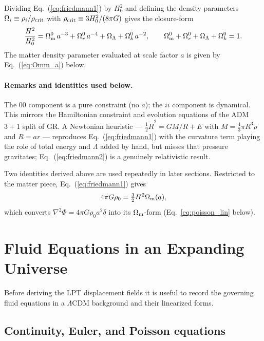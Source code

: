 \documentclass[12pt]{article}
\newcommand{\Omm}{\Omega_{\rm m}}
\begin{document}
Dividing Eq.~(\ref{eq:friedmann1}) by $H_0^2$ and defining the
density parameters $\Omega_i \equiv \rho_i/\rho_{\rm crit}$ with
$\rho_{\rm crit} \equiv 3H_0^2/(8\pi G)$ gives the closure-form
%
\begin{equation}
  \frac{H^2}{H_0^2}
  = \Omm^0\,a^{-3} + \Omega_r^0\,a^{-4}
    + \Omega_\Lambda + \Omega_k^0\,a^{-2},
  \qquad
  \Omm^0+\Omega_r^0+\Omega_\Lambda+\Omega_k^0 = 1.
  \label{eq:friedmann_omega}
\end{equation}
%
The matter density parameter evaluated at scale factor $a$ is given
by Eq.~(\ref{eq:Omm_a}) below.

\paragraph{Remarks and identities used below.}
The $00$ component is a pure constraint (no $\ddot a$); the $ii$
component is dynamical.  This mirrors the Hamiltonian constraint and
evolution equations of the ADM $3+1$ split of GR.  A Newtonian
heuristic --- $\tfrac{1}{2}\dot R^2 = GM/R + E$ with
$M=\tfrac{4}{3}\pi R^3\rho$ and $R=ar$ --- reproduces
Eq.~(\ref{eq:friedmann1}) with the curvature term playing the role
of total energy and $\Lambda$ added by hand, but misses that
pressure gravitates; Eq.~(\ref{eq:friedmann2}) is a genuinely
relativistic result.

Two identities derived above are used repeatedly in later sections.
Restricted to the matter piece, Eq.~(\ref{eq:friedmann1}) gives
%
\begin{equation}
  4\pi G\rho_0 = \tfrac{3}{2}H^2\Omm(a),
  \label{eq:friedmann_id_poisson}
\end{equation}
%
which converts $\nabla^2\Phi = 4\pi G\rho_0 a^2\delta$ into its
$\Omm$-form (Eq.~\ref{eq:poisson_lin} below).

\section{Fluid Equations in an Expanding Universe}
\label{sec:fluid}

Before deriving the LPT displacement fields it is useful to record the
governing fluid equations in a $\Lambda$CDM background and their
linearized forms.

\subsection{Continuity, Euler, and Poisson equations}
\end{document}
